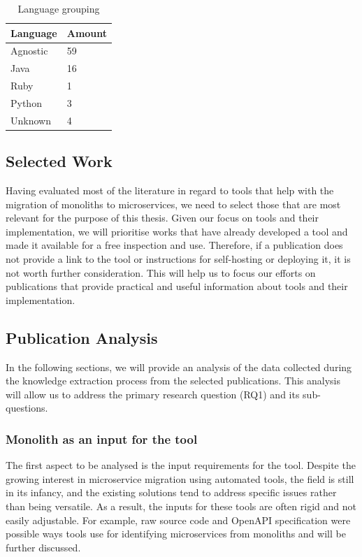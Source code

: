 \documentclass[conference]{IEEEtran}
\begin{document}
\begin{table}[!htb] \caption{Language grouping} \label{tab:language-grouping}
  \begin{center}
    \begin{tabular}[c]{p{12em}|p{4em}}
      \textbf{Language} &
      \textbf{Amount} \\
      \hline Agnostic & {59} \\
      \hline Java & {16} \\
      \hline Ruby & {1} \\
      \hline Python & {3} \\
      \hline Unknown & {4} \\
    \end{tabular}
  \end{center}
\end{table}

\subsection{Selected Work}

Having evaluated most of the literature in regard to tools that help with the
migration of monoliths to microservices, we need to select those that are most
relevant for the purpose of this thesis. Given our focus on tools and their
implementation, we will prioritise works that have already developed a tool and
made it available for a free inspection and use. Therefore, if a publication
does not provide a link to the tool or instructions for self-hosting or
deploying it, it is not worth further consideration. This will help us to focus
our efforts on publications that provide practical and useful information about
tools and their implementation.

\subsection{Publication Analysis}

In the following sections, we will provide an analysis of the data collected
during the knowledge extraction process from the selected publications. This
analysis will allow us to address the primary research question (RQ1) and its
sub-questions.

\subsubsection{Monolith as an input for the tool}

The first aspect to be analysed is the input requirements for the tool. Despite
the growing interest in microservice migration using automated tools, the field
is still in its infancy, and the existing solutions tend to address specific
issues rather than being versatile. As a result, the inputs for these tools are
often rigid and not easily adjustable. For example, raw source code and OpenAPI
specification were possible ways tools use for identifying microservices from
monoliths and will be further discussed.
\end{document}
